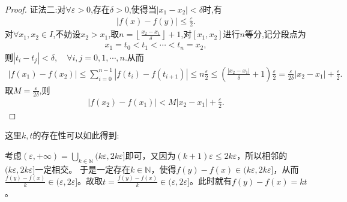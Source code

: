 \documentclass[../../main.tex]{subfiles}%
\begin{document}
\begin{proof}
{\color{blue}证法二:}对$\forall \varepsilon >0$,存在$\delta >0$,使得当$|x_1-x_2|<\delta$时,有
\begin{align*}
|f(x)-f(y)|\leqslant \frac{\varepsilon}{2}.
\end{align*}
对$\forall x_1,x_2\in I$,不妨设$x_2>x_1$,取$n=\left\lfloor \frac{x_2-x_1}{\delta} \right\rfloor +1$,对$[x_1,x_2]$进行$n$等分,记分段点为
\begin{align*}
x_1=t_0<t_1<\cdots <t_n=x_2,
\end{align*}
则$|t_i-t_j|<\delta ,\quad \forall i,j=0,1,\cdots ,n$.从而
\begin{align*}
|f(x_1)-f(x_2)|\leqslant \sum\limits_{i=0}^{n-1}{|f(t_i)-f(t_{i+1})|}\leqslant n\frac{\varepsilon}{2}\leqslant \left( \frac{|x_2-x_1|}{\delta}+1 \right) \frac{\varepsilon}{2}=\frac{\varepsilon}{2\delta}|x_2-x_1|+\frac{\varepsilon}{2}.
\end{align*}
取$M=\frac{\varepsilon}{2\delta}$,则
\begin{align*}
|f(x_2)-f(x_1)|<M|x_2-x_1|+\frac{\varepsilon}{2}.
\end{align*}

\end{proof}
\begin{remark}
\hypertarget{k,t的存在性}{这里\(k,t\)的存在性可以如此得到:}考虑\((\varepsilon,+\infty)=\bigcup_{k\in \mathbb{N}}{(k\varepsilon,2k\varepsilon]}\)即可，又因为\((k + 1)\varepsilon\leqslant 2k\varepsilon\)，所以相邻的\((k\varepsilon,2k\varepsilon]\)一定相交。
于是一定存在\(k\in \mathbb{N}\)，使得\(f(y) - f(x)\in (k\varepsilon,2k\varepsilon]\)，从而\(\frac{f(y) - f(x)}{k}\in (\varepsilon,2\varepsilon]\)。故取\(t = \frac{f(y) - f(x)}{k}\in (\varepsilon,2\varepsilon]\)。此时就有\(f(y) - f(x) = kt\)。 
\end{remark}
\end{document}
